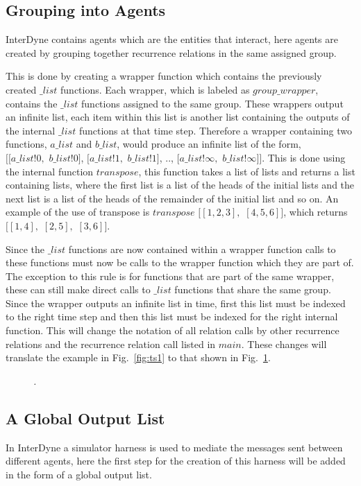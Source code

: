 \documentclass{article}
\begin{document}
\subsection{Grouping into Agents}
InterDyne contains agents which are the entities that interact, here agents are created by grouping together recurrence relations in the same assigned group.  

This is done by creating a wrapper function which contains the previously created $\_list$ functions. Each wrapper, which is labeled as $group\_wrapper$, contains the $\_list$ functions assigned to the same group. These wrappers output an infinite list, each item within this list is another list containing the outputs of the internal $\_list$ functions at that time step. Therefore a wrapper containing two functions, $a\_list$ and $b\_list$, would produce an infinite list of the form,\\
$[[a\_list!0,$ $b\_list!0]$, $[a\_list!1,$ $b\_list!1]$, .., $[a\_list!\infty,$ $b\_list!\infty]]$. This is done using the internal function $transpose$, this function takes a list of lists and returns a list containing lists, where the first list is a list of the heads of the initial lists and the next list is a list of the heads of the remainder of the initial list and so on. An example of the use of transpose is $transpose$ $[[1,2,3],$ $[4,5,6]]$, which returns $[[1,4],$ $[2,5],$ $[3,6]]$.

Since the $\_list$ functions are now contained within a wrapper function calls to these functions must now be calls to the wrapper function which they are part of. The exception to this rule is for functions that are part of the same wrapper, these can still make direct calls to $\_list$ functions that share the same group. Since the wrapper outputs an infinite list in time, first this list must be indexed to the right time step and then this list must be indexed for the right internal function. This will change the notation of all relation calls by other recurrence relations and the recurrence relation call listed in $main$. These changes will translate the example in Fig.~\ref{fig:ts1} to that shown in Fig.~\ref{fig:ts2}.
\begin{figure}[H]
	\centering
	
	\caption{\it .}
	\label{fig:ts2}
\end{figure} 



\subsection{A Global Output List}
In InterDyne a simulator harness is used to mediate the messages sent between different agents, here the first step for the creation of this harness will be added in the form of a global output list. 
\end{document}
